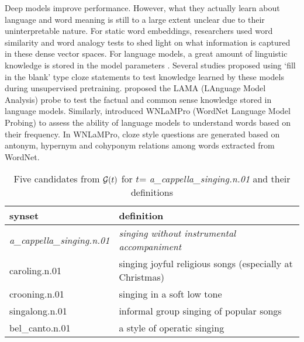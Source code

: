 \documentclass[11pt,a4paper]{article}
\begin{document}

Deep models improve performance. However,
what they actually learn about language and word meaning  is
still to a large extent unclear due to their uninterpretable
nature. For static word embeddings, researchers used word
similarity \cite{hill15simlex} and word analogy
\cite{gladkova16analogy} tests to shed light on what
information is captured in these dense vector spaces. For
language models, a great amount of linguistic knowledge is
stored in the model parameters \cite{peters18dissecting}.
Several studies proposed using `fill in the blank' type
cloze statements to test  knowledge learned by these models
during unsupervised pretraining. 
proposed the LAMA (LAnguage Model Analysis) probe to test
the factual and common sense knowledge stored in  language
models.
Similarly, \citet{Schick20rareWords} introduced WNLaMPro
(WordNet Language Model Probing)  to assess the ability of
language models to understand words based on their
frequency. In WNLaMPro, cloze style questions are generated
based on antonym, hypernym and cohyponym relations among
words extracted from WordNet.


\begin{table*}
    \centering
    \begin{tabular}{l|l}
    \hline
    \textbf{synset} & \textbf{definition} \\ \hline
    \emph{a\_cappella\_singing.n.01} & \emph{singing without instrumental accompaniment} \\
     caroling.n.01 & singing joyful religious songs (especially at Christmas) \\
     crooning.n.01 & singing in a soft low tone \\
     singalong.n.01 & informal group singing of popular songs \\
     bel\_canto.n.01 & a style of operatic singing \\ \hline
   
    \end{tabular}
    \caption{Five candidates from ${\cal G}(t)$ for $t$=  \emph{a\_cappella\_singing.n.01} and their definitions} 
    \label{tab:dataset_samples}
\end{table*}
\end{document}
